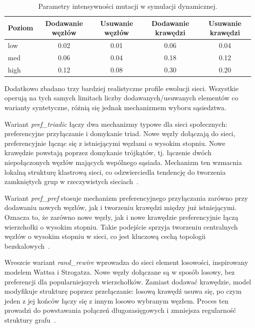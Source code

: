 \begin{table}[H]
  \centering
  \caption{Parametry intensywności mutacji w symulacji dynamicznej.}
  \label{tab:dyn-mutation-levels}
  \begin{tabular}{lcccc}
    \toprule
    \textbf{Poziom} & \textbf{Dodawanie węzłów} & \textbf{Usuwanie węzłów} & \textbf{Dodawanie krawędzi} & \textbf{Usuwanie krawędzi} \\
    \midrule
    low             & 0.02                      & 0.01                     & 0.06                        & 0.04                       \\
    med             & 0.06                      & 0.04                     & 0.18                        & 0.12                       \\
    high            & 0.12                      & 0.08                     & 0.30                        & 0.20                       \\
  \end{tabular}
\end{table}


Dodatkowo zbadano trzy bardziej realistyczne profile ewolucji sieci. Wszystkie operują na tych samych limitach liczby dodawanych/usuwanych elementów co warianty syntetyczne, różnią się jednak mechanizmem wyboru sąsiedztwa.

Wariant \emph{pref\_triadic} łączy dwa mechanizmy typowe dla sieci społecznych: preferencyjne przyłączanie i domykanie triad. Nowe węzły dołączają do sieci, preferencyjnie łącząc się z istniejącymi węzłami o wysokim stopniu. Nowe krawędzie powstają poprzez domykanie trójkątów, tj. łączenie dwóch niepołączonych węzłów mających wspólnego sąsiada. Mechanizm ten wzmacnia lokalną strukturę klastrową sieci, co odzwierciedla tendencję do tworzenia zamkniętych grup w rzeczywistych sieciach~\cite{albert2002statistical,kamola2016dynamika}.

Wariant \emph{pref\_pref} stosuje mechanizm preferencyjnego przyłączania zarówno przy dodawaniu nowych węzłów, jak i tworzeniu krawędzi między już istniejącymi. Oznacza to, że zarówno nowe węzły, jak i nowe krawędzie preferencyjnie łączą wierzchołki o wysokim stopniu. Takie podejście sprzyja tworzeniu centralnych węzłów o wysokim stopniu w sieci, co jest kluczową cechą topologii bezskalowych~\cite{albert2002statistical}.

Wreszcie wariant \emph{rand\_rewire} wprowadza do sieci element losowości, inspirowany modelem Wattsa i Strogatza. Nowe węzły dołączane są w sposób losowy, bez preferencji dla popularniejszych wierzchołków. Zamiast dodawać krawędzie, model modyfikuje strukturę poprzez przełączanie: losową krawędź usuwa się, po czym jeden z jej końców łączy się z innym losowo wybranym węzłem. Proces ten prowadzi do powstawania połączeń długozasięgowych i zmniejsza regularność struktury grafu~\cite{watts1998collective}.



